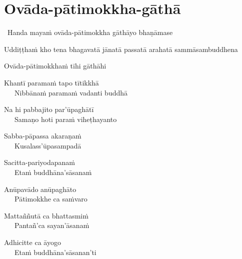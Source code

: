 
\section{Ovāda-pātimokkha-gāthā}
\label{ovada-patimokkha-gatha}

\begin{intro}
	\anglebracketleft\ \hspace{-0.5mm}Handa mayaṁ ovāda-pātimokkha gāthāyo bhaṇāmase \hspace{-0.5mm}\anglebracketright\
\end{intro}


\begin{hanging-indent}
Uddiṭṭhaṁ kho tena bhagavatā jānatā passatā arahatā sammāsambuddhena
\end{hanging-indent}
Ovāda-pātimokkhaṁ tīhi gāthāhi
\begin{hanging-indent}
Khantī paramaṁ tapo tītikkhā\\
Nibbānaṁ paramaṁ vadanti buddhā
\end{hanging-indent}

\begin{hanging-indent}
Na hi pabbajito par'ūpaghātī\\
Samaṇo hoti paraṁ viheṭhayanto
\end{hanging-indent}

\begin{hanging-indent}
Sabba-pāpassa akaraṇaṁ\\
Kusalass'ūpasampadā
\end{hanging-indent}

\begin{hanging-indent}
Sacitta-pariyodapanaṁ\\
Etaṁ buddhāna'sāsanaṁ
\end{hanging-indent}

\begin{hanging-indent}
Anūpavādo anūpaghāto\\
Pātimokkhe ca saṁvaro
\end{hanging-indent}

\begin{hanging-indent}
Mattaññutā ca bhattasmiṁ\\
Pantañ'ca sayan'āsanaṁ
\end{hanging-indent}

\begin{hanging-indent}
Adhicitte ca āyogo\\
Etaṁ buddhāna'sāsanan'ti
\end{hanging-indent}

